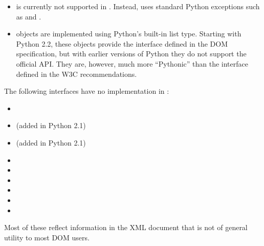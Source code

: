 \begin{itemize}
\item {} is currently not supported in
      .  Instead,
       uses standard Python exceptions such
      as  and .

\item {} objects are implemented using Python's built-in
      list type.  Starting with Python 2.2, these objects provide the
      interface defined in the DOM specification, but with earlier
      versions of Python they do not support the official API.  They
      are, however, much more ``Pythonic'' than the interface defined
      in the W3C recommendations.
\end{itemize}


The following interfaces have no implementation in
:

\begin{itemize}
\item {}

\item {} (added in Python 2.1)

\item {} (added in Python 2.1)

\item {}

\item {}

\item {}

\item {}

\item {}

\item {}
\end{itemize}

Most of these reflect information in the XML document that is not of
general utility to most DOM users.
